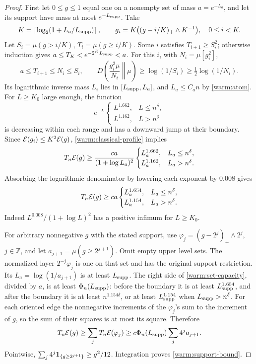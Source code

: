 \begin{proof}
First let \(0\le g\le1\) equal one on a nonempty set of mass
\(a=e^{-L_a}\), and let its support have mass at most \(e^{-L_{\rm supp}}\).
Take
\[
 K=\left\lceil\log_2(1+L_a/L_{\rm supp})\right\rceil,\qquad
 g_i=K\bigl((g-i/K)_+\wedge K^{-1}\bigr),\quad 0\le i<K .
\]
Let \(S_i=\mu(g>i/K)\), \(T_i=\mu(g\ge i/K)\).
Some \(i\) satisfies \(T_{i+1}\ge S_i^2\); otherwise induction gives
\(a\le T_K<e^{-2^KL_{\rm supp}}<a\).  For this \(i\), with \(N_i=\mu[g_i^2]\),
\[
 a\le T_{i+1}\le N_i\le S_i,\qquad
 D\!\left(\frac{g_i^2\mu}{N_i}\middle\Vert\mu\right)
       \ge\log(1/S_i)\ge\tfrac12\log(1/N_i).
\]
Its logarithmic inverse mass \(L_i\) lies in \([L_{\rm supp},L_a]\),
and \(L_a\le C_an\) by \eqref{warm:atom}.  For \(L\ge K_0\)
large enough, the function
\[
 e^{-L}
 \begin{cases}L^{1.662},&L\le n^\delta,\\
               L^{1.162},&L>n^\delta
 \end{cases}
\]
is decreasing within each range and has a downward jump at their
boundary.  Since \(\mathcal E(g_i)\le K^2\mathcal E(g)\),
\eqref{warm:classical-profile} implies
\[
 T_n\mathcal E(g)\ge
 \frac{ca}{(1+\log L_a)^2}
 \begin{cases}L_a^{1.662},&L_a\le n^\delta,\\
               L_a^{1.162},&L_a>n^\delta .
 \end{cases}
\]
Absorbing the logarithmic denominator by lowering each exponent by
\(0.008\) gives
\begin{equation}
 T_n\mathcal E(g)\ge ca
 \begin{cases}L_a^{1.654},&L_a\le n^\delta,\\
               L_a^{1.154},&L_a>n^\delta .
 \end{cases}                                                \label{warm:set-capacity}
\end{equation}
Indeed \(L^{0.008}/(1+\log L)^2\) has a positive infimum for
\(L\ge K_0\).

For arbitrary nonnegative \(g\) with the stated support, use
\(\varphi_j=(g-2^j)_+\wedge2^j\), \(j\in\mathbb Z\), and let
\(a_{j+1}=\mu(g\ge2^{j+1})\).  Omit empty upper level sets.
The normalized layer \(2^{-j}\varphi_j\) is one on that set and
has the original support restriction.  Its \(L_a=\log(1/a_{j+1})\)
is at least \(L_{\rm supp}\).  The right side of
\eqref{warm:set-capacity}, divided by \(a\), is at least
\(\Phi_n(L_{\rm supp})\): before the boundary it is at least \(L_{\rm supp}^{1.654}\),
and after the boundary it is at least \(n^{1.154\delta}\), or at
least \(L_{\rm supp}^{1.154}\) when \(L_{\rm supp}>n^\delta\).
For each oriented edge the nonnegative increments of the
\(\varphi_j\)'s sum to the increment of \(g\), so the sum of their
squares is at most its square.  Therefore
\[
 T_n\mathcal E(g)\ge\sum_jT_n\mathcal E(\varphi_j)
       \ge c\Phi_n(L_{\rm supp})\sum_j4^ja_{j+1}.
\]
Pointwise,
\(\sum_j4^j\mathbf 1_{\{g\ge2^{j+1}\}}\ge g^2/12\).
Integration proves \eqref{warm:support-bound}.
\end{proof}

